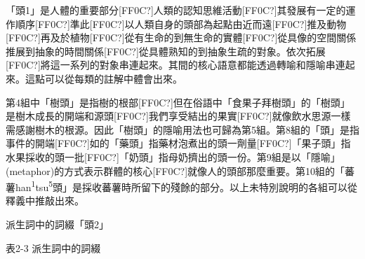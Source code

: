 \textrm{「頭1」是人體的重要部分[FF0C?]人類的認知思維活動[FF0C?]其發展有一定的運作順序[FF0C?]準此[FF0C?]以人類自身的頭部為起點由近而遠[FF0C?]推及動物[FF0C?]再及於植物[FF0C?]從有生命的到無生命的實體[FF0C?]從具像的空間關係推展到抽象的時間關係[FF0C?]從具體熟知的到抽象生疏的對象。依次拓展[FF0C?]將這一系列的對象串連起來。其間的核心語意都能透過轉喻和隱喻串連起來。這點可以從每類的註解中體會出來。}

\textrm{第4組中「樹頭」}是指樹的根部[FF0C?]但在俗語\textrm{中「食果子拜樹頭」的「樹頭」是樹木成長的開端和源頭[FF0C?]我們享受結出的果實[FF0C?]就像飲水思源一樣需感謝樹木的根源。}因此\textrm{「樹頭」}的隱喻用法也可歸為第5組。第8組的\textrm{「頭」}是指事件的開端[FF0C?]如的\textrm{「}藥\textrm{頭」}指藥材泡煮出的頭一劑量[FF0C?]\textrm{「}果子\textrm{頭」}指水果採收的頭一批[FF0C?]\textrm{「}奶\textrm{頭」}指母奶擠出的頭一份。\textrm{第9組是以「隱喻」(metaphor)的方式表示群體的核心[FF0C?]就像人的頭部那麼重要。第10組的「蕃薯han}\textrm{\textsuperscript{1}}\textrm{tsu}\textrm{\textsuperscript{5}}\textrm{頭」是採收蕃薯時所留下的殘餘的部分。}以上未特別說明的各組可以從釋義中推敲出來。

\textrm{派生詞中的詞綴「頭2」}

\rmfamily
表2-3 派生詞中的詞綴

\tablefirsthead{}

